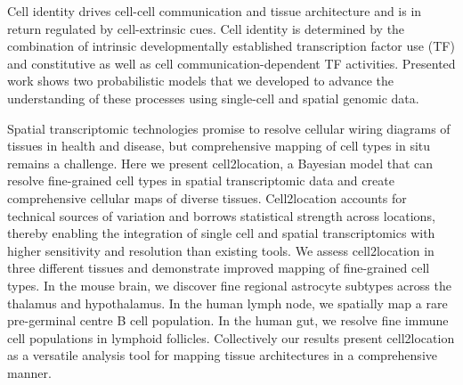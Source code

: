 \noindent
Cell identity drives cell-cell communication and tissue architecture and is in return regulated by cell-extrinsic cues. Cell identity is determined by the combination of intrinsic developmentally established transcription factor use (TF) and constitutive as well as cell communication-dependent TF activities. Presented work shows two probabilistic models that we developed to advance the understanding of these processes using single-cell and spatial genomic data.
 
Spatial transcriptomic technologies promise to resolve cellular wiring diagrams of tissues in health and disease, but comprehensive mapping of cell types in situ remains a challenge. Here we present cell2location, a Bayesian model that can resolve fine-grained cell types in spatial transcriptomic data and create comprehensive cellular maps of diverse tissues. Cell2location accounts for technical sources of variation and borrows statistical strength across locations, thereby enabling the integration of single cell and spatial transcriptomics with higher sensitivity and resolution than existing tools. We assess cell2location in three different tissues and demonstrate improved mapping of fine-grained cell types. In the mouse brain, we discover fine regional astrocyte subtypes across the thalamus and hypothalamus. In the human lymph node, we spatially map a rare pre-germinal centre B cell population. In the human gut, we resolve fine immune cell populations in lymphoid follicles. Collectively our results present cell2location as a versatile analysis tool for mapping tissue architectures in a comprehensive manner.
 
